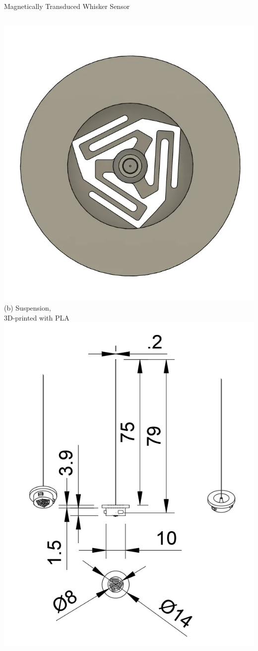 \documentclass[AIRbeamer
,optEnglish
,optBiber
,optBibstyleAlphabetic
,optBeamerClassicFormat%
]{AIRlatex}
\begin{document}
\begin{frame}[c]{Magnetically Transduced Whisker Sensor}
\begin{columns}[c,onlytextwidth]
            \includegraphics[height=0.6\textheight]{figures/suspension}\\
            (b) Suspension,\\3D-printed with PLA
            \centering
            \includegraphics[height=0.6\textheight]{figures/whisker-dims}\\

\end{columns}
\end{frame}
\end{document}

